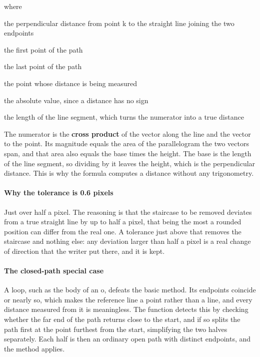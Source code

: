 \noindent where
\begin{description}[leftmargin=2.4em,style=nextline,font=\normalfont\ttfamily]\setlength\itemsep{1pt}
  \item[{$d_k$}] \normalfont the perpendicular distance from point k to the straight line joining the two endpoints
  \item[{$(x_a,y_a)$}] \normalfont the first point of the path
  \item[{$(x_b,y_b)$}] \normalfont the last point of the path
  \item[{$(x_k,y_k)$}] \normalfont the point whose distance is being measured
  \item[{$|\cdot|$}] \normalfont the absolute value, since a distance has no sign
  \item[{$\sqrt{\cdot}$}] \normalfont the length of the line segment, which turns the numerator into a true distance
\end{description}
The numerator is the \textbf{cross product} of the vector along the line and the vector to the point. Its magnitude equals the area of the parallelogram the two vectors span, and that area also equals the base times the height. The base is the length of the line segment, so dividing by it leaves the height, which is the perpendicular distance. This is why the formula computes a distance without any trigonometry.


\paragraph{Why the tolerance is 0.6 pixels}
Just over half a pixel. The reasoning is that the staircase to be removed deviates from a true straight line by up to half a pixel, that being the most a rounded position can differ from the real one. A tolerance just above that removes the staircase and nothing else: any deviation larger than half a pixel is a real change of direction that the writer put there, and it is kept.


\paragraph{The closed-path special case}
A loop, such as the body of an o, defeats the basic method. Its endpoints coincide or nearly so, which makes the reference line a point rather than a line, and every distance measured from it is meaningless. The function detects this by checking whether the far end of the path returns close to the start, and if so splits the path first at the point furthest from the start, simplifying the two halves separately. Each half is then an ordinary open path with distinct endpoints, and the method applies.


